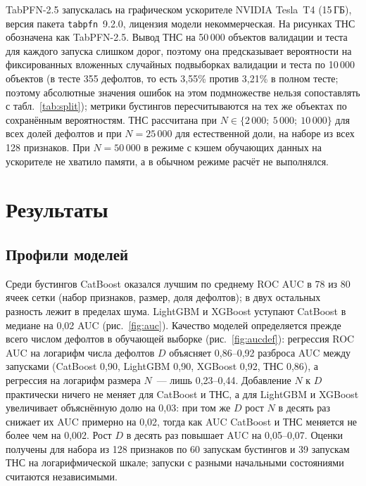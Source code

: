 \documentclass{misisarticle}
\begin{document}
TabPFN-2.5 \cite{tabpfn25} запускалась на графическом ускорителе NVIDIA Tesla~T4 (15\,ГБ), версия пакета \texttt{tabpfn}~9.2.0, лицензия модели некоммерческая. На рисунках ТНС обозначена как TabPFN-2.5. Вывод ТНС на 50\,000 объектов валидации и теста для каждого запуска слишком дорог, поэтому она предсказывает вероятности на фиксированных вложенных случайных подвыборках валидации и теста по 10\,000 объектов (в тесте 355 дефолтов, то есть 3,55\% против 3,21\% в полном тесте; поэтому абсолютные значения ошибок на этом подмножестве нельзя сопоставлять с табл.~\ref{tab:split}); метрики бустингов пересчитываются на тех же объектах по сохранённым вероятностям. ТНС рассчитана при $N\in\{2\,000;\ 5\,000;\ 10\,000\}$ для всех долей дефолтов и при $N=25\,000$ для естественной доли, на наборе из всех 128 признаков. При $N=50\,000$ в режиме с кэшем обучающих данных на ускорителе не хватило памяти, а в обычном режиме расчёт не выполнялся.

\section{Результаты}
\label{sec:results}

\subsection{Профили моделей}

Среди бустингов CatBoost оказался лучшим по среднему ROC AUC в 78 из 80 ячеек сетки (набор признаков, размер, доля дефолтов); в двух остальных разность лежит в пределах шума. LightGBM и XGBoost уступают CatBoost в медиане на 0,02 AUC (рис.~\ref{fig:auc}). Качество моделей определяется прежде всего числом дефолтов в обучающей выборке (рис.~\ref{fig:aucdef}): регрессия ROC AUC на логарифм числа дефолтов $D$ объясняет 0,86--0,92 разброса AUC между запусками (CatBoost 0,90, LightGBM 0,90, XGBoost 0,92, ТНС 0,86), а регрессия на логарифм размера $N$~--- лишь 0,23--0,44. Добавление $N$ к $D$ практически ничего не меняет для CatBoost и ТНС, а для LightGBM и XGBoost увеличивает объяснённую долю на 0,03: при том же $D$ рост $N$ в десять раз снижает их AUC примерно на 0,02, тогда как AUC CatBoost и ТНС меняется не более чем на 0,002. Рост $D$ в десять раз повышает AUC на 0,05--0,07. Оценки получены для набора из 128 признаков по 60 запускам бустингов и 39 запускам ТНС на логарифмической шкале; запуски с разными начальными состояниями считаются независимыми.
\end{document}
